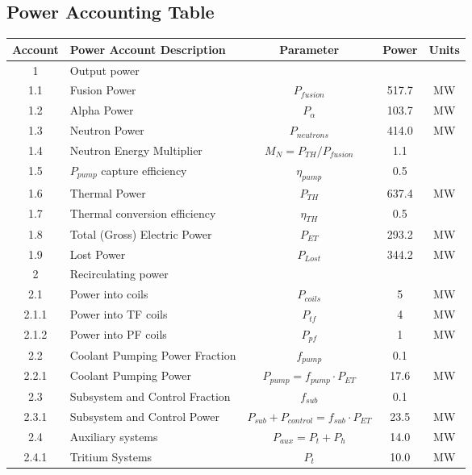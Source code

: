 \newpage
\subsection{Power Accounting Table}

\begin{table}[ht!]								
\centering								
\begin{tabular}{|c|p{5cm}|c|c|c|}								
\hline								
\textbf{Account}	&	\textbf{Power Account Description}	&	\textbf{Parameter }	&	\textbf{Power}	&	\textbf{Units} \\
\hline								
1	&	Output power	&		&		&	\\
\hline
1.1	&	Fusion Power	&	$P_{{fusion}}$	&	517.7	&	MW \\
1.2	&	Alpha Power	&	$P_{{\alpha}}$	&	103.7	&	MW \\
1.3	&	Neutron Power	&	$P_{{neutrons}}$	&	414.0	&	MW \\
1.4	&	Neutron Energy Multiplier	&	$M_N = P_{{TH}}/P_{{fusion}}$	&	1.1	&	\\
1.5	&	$P_{pump}$ capture efficiency	&	$\eta_{{pump}}$	&	0.5	&	\\
1.6	&	Thermal Power	&	$P_{{TH}}$	&	637.4	&	MW \\
1.7	&	Thermal conversion efficiency	&	$\eta_{{TH}}$	&	0.5	&	\\
1.8	&	Total (Gross) Electric Power	&	$P_{{ET}}$	&	293.2	&	MW \\
1.9	&	Lost Power	&	$P_{{Lost}}$	&	344.2	&	MW \\
\hline								
2	&	Recirculating power	&		&		&	\\
\hline
2.1	&	Power into coils 	&	$P_{coils}$ &	5	&	MW \\
2.1.1	&	Power into TF coils	&	$P_{tf}$	&	4	&	MW \\
2.1.2	&	Power into PF coils	&	$P_{pf}$	&	1		&	MW \\
2.2	&	Coolant Pumping Power Fraction	&	$f_{{pump}}$	&	0.1 &	\\
2.2.1	&	Coolant Pumping Power	&	$P_{{pump}} = f_{{pump}} \cdot P_{{ET}}$	&	17.6	&	MW \\
2.3	&	Subsystem and Control Fraction	&	$f_{{sub}}$	&	0.1	&	\\
2.3.1	&	Subsystem and Control Power	&	$P_{{sub}} + P_{{control}} = f_{{sub}} \cdot P_{{ET}}$	&	23.5	&	MW \\
2.4	&	Auxiliary systems	&	$P_{{aux}} = P_{{t}} + P_{{h}}$	&	14.0	&	MW \\
2.4.1	&	Tritium Systems	&	$P_{{t}}$	&	10.0	&	MW \\

\end{tabular}
\end{table}
